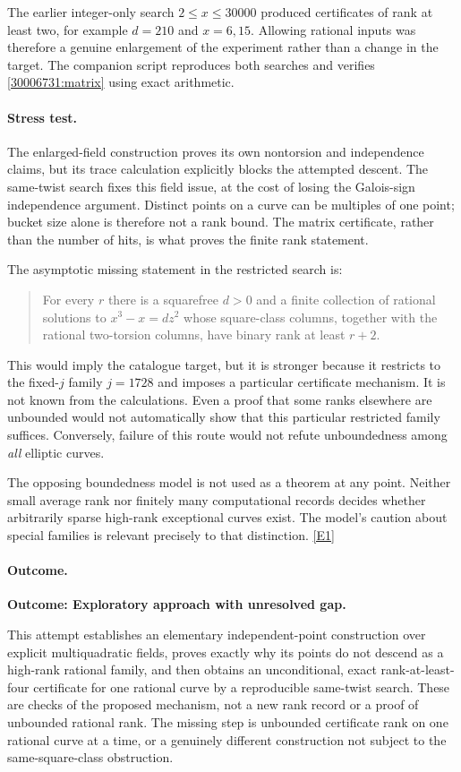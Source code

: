 \documentclass[11pt,a4paper]{article}
\newcommand{\eref}[2]{\hyperlink{extra:#1:#2}{[E#2]}}
\numberwithin{equation}{section}
\begin{document}
The earlier integer-only search $2\leq x\leq30000$ produced certificates of
rank at least two, for example $d=210$ and $x=6,15$. Allowing rational inputs
was therefore a genuine enlargement of the experiment rather than a change
in the target. The companion script reproduces both searches and verifies
\eqref{30006731:matrix} using exact arithmetic.

\paragraph{Stress test.}
The enlarged-field construction proves its own nontorsion and independence
claims, but its trace calculation explicitly blocks the attempted descent.
The same-twist search fixes this field issue, at the cost of losing the
Galois-sign independence argument. Distinct points on a curve can be
multiples of one point; bucket size alone is therefore not a rank bound.
The matrix certificate, rather than the number of hits, is what proves the
finite rank statement.

The asymptotic missing statement in the restricted search is:
\begin{quote}
For every $r$ there is a squarefree $d>0$ and a finite collection of rational
solutions to $x^3-x=dz^2$ whose square-class columns, together with the
rational two-torsion columns, have binary rank at least $r+2$.
\end{quote}
This would imply the catalogue target, but it is stronger because it restricts
to the fixed-$j$ family $j=1728$ and imposes a particular certificate mechanism.
It is not known from the calculations. Even a proof that some ranks elsewhere
are unbounded would not automatically show that this particular restricted
family suffices. Conversely, failure of this route would not refute
unboundedness among \emph{all} elliptic curves.

The opposing boundedness model is not used as a theorem at any point.
Neither small average rank nor finitely many computational records decides
whether arbitrarily sparse high-rank exceptional curves exist. The model's
caution about special families is relevant precisely to that distinction.
\eref{30006731}{1}

\paragraph{Outcome.}
\textbf{Outcome: Exploratory approach with unresolved gap.}

This attempt establishes an elementary independent-point construction over
explicit multiquadratic fields, proves exactly why its points do not descend
as a high-rank rational family, and then obtains an unconditional, exact
rank-at-least-four certificate for one rational curve by a reproducible
same-twist search. These are checks of the proposed mechanism, not a new
rank record or a proof of unbounded rational rank. The missing step is
unbounded certificate rank on one rational curve at a time, or a genuinely
different construction not subject to the same-square-class obstruction.
\end{document}
